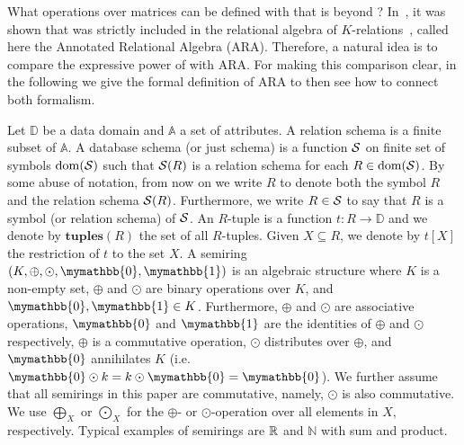 What operations over matrices can be defined with \langsum that is beyond \lang? In~\cite{brijder2019matrices}, it was shown that \lang was strictly included in the relational algebra of $K$-relations~\cite{GreenKT07}, called here the Annotated Relational Algebra (ARA).
Therefore, a natural idea is to compare the expressive power of \langsum with ARA. For making this comparison clear, in the following we give the formal definition of ARA to then see how to connect both formalism.

\newcommand{\ddom}{\mathbb{D}}
\newcommand{\fdom}{\operatorname{dom}}
\newcommand{\att}{\mathbb{A}}
\newcommand{\tuples}{\mathbf{tuples}}
\newcommand{\supp}{\operatorname{supp}}
\newcommand{\cJ}{\mathcal{J}}
\newcommand{\adom}{\mathbf{adom}}

\newcommand{\ksum}{\oplus}
\newcommand{\kprod}{\odot}
\newcommand{\bigksum}{\bigoplus}
\newcommand{\bigkprod}{\bigodot}
\newcommand{\kzero}{\mymathbb{0}}
\newcommand{\kone}{\mymathbb{1}}


Let $\ddom$ be a data domain and $\att$ a set of attributes. A relation schema is a finite subset of $\att$. A database schema (or just schema) is a function $\mathcal{S}$ on finite set of symbols $\fdom(\cS)$ such that $\mathcal{S}(R)$ is a relation schema for each $R \in \fdom(\cS)$. By some abuse of notation, from now on we write $R$ to denote both the symbol $R$ and the relation schema $\mathcal{S}(R)$.
Furthermore, we write $R \in \mathcal{S}$ to say that $R$ is a symbol (or relation schema) of $\mathcal{S}$. 
An $R$-tuple is a function $t: R \rightarrow \ddom$ and we denote by $\tuples(R)$ the set of all $R$-tuples. Given $X \subseteq R$, we denote by $t[X]$ the restriction of $t$ to the set $X$.
A semiring $(K, \ksum, \kprod, \kzero, \kone)$ is an algebraic structure where $K$ is a non-empty set, $\ksum$ and $\kprod$ are binary operations over $K$, and $\kzero, \kone \in K$. Furthermore,  $\ksum$ and $\kprod$ are associative operations, $\kzero$ and $\kone$ are the identities of $\ksum$ and $\kprod$ respectively, $\ksum$ is a commutative operation, $\kprod$ distributes over $\ksum$, and $\kzero$ annihilates $K$ (i.e. $\kzero \kprod k = k \kprod \kzero = \kzero$). We further assume that all semirings in this paper are commutative, namely, $\kprod$ is also commutative. We use $\bigksum_X$ or $\bigkprod_X$ for the $\ksum$- or $\kprod$-operation over all elements in $X$, respectively. Typical examples of semirings are $\mathbb{R}$ and $\mathbb{N}$ with sum and product. 


